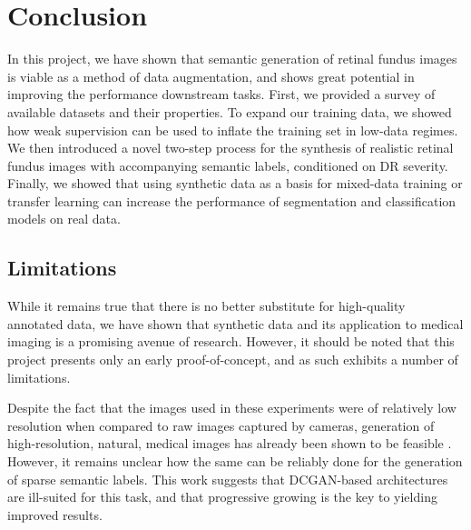 \chapter{Conclusion}

In this project, we have shown that semantic generation of retinal fundus images is viable as a method of data augmentation, and shows great potential in improving the performance downstream tasks.
First, we provided a survey of available datasets and their properties.
To expand our training data, we showed how weak supervision can be used to inflate the training set in low-data regimes.
We then introduced a novel two-step process for the synthesis of realistic retinal fundus images with accompanying semantic labels, conditioned on DR severity.
Finally, we showed that using synthetic data as a basis for mixed-data training or transfer learning can increase the performance of segmentation and classification models on real data.

\section{Limitations}

While it remains true that there is no better substitute for high-quality annotated data, we have shown that synthetic data and its application to medical imaging is a promising avenue of research.
However, it should be noted that this project presents only an early proof-of-concept, and as such exhibits a number of limitations.

Despite the fact that the images used in these experiments were of relatively low resolution when compared to raw images captured by cameras, generation of high-resolution, natural, medical images has already been shown to be feasible \cite{mammogan}.
However, it remains unclear how the same can be reliably done for the generation of sparse semantic labels.
This work suggests that DCGAN-based architectures are ill-suited for this task, and that progressive growing is the key to yielding improved results.

